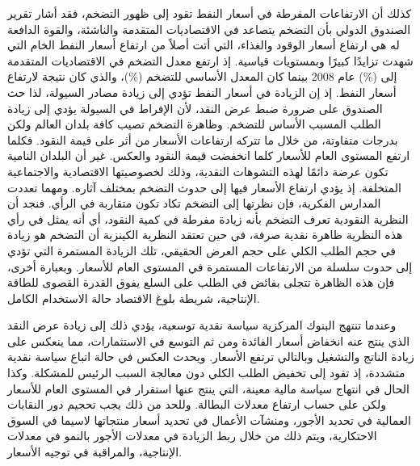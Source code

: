 \documentclass[10pt,a4paper]{report}
\begin{document}
\begin{doublespacing}
كذلك أن الارتفاعات المفرطة في أسعار النفط تقود إلى ظهور التضخم، فقد أشار تقرير الصندوق الدولي بأن التضخم يتصاعد في الاقتصاديات المتقدمة والناشئة، والقوة الدافعة له هي ارتفاع أسعار الوقود والغذاء، التي أتت أصلاً من ارتفاع أسعار النفط الخام التي شهدت تزايدًا كبيرًا وبمستويات قياسية. إذ ارتفع معدل التضخم في الاقتصاديات المتقدمة إلى (\%) عام 2008 بينما كان المعدل الأساسي للتضخم (\%)، والذي كان نتيجة لارتفاع أسعار النفط. إذ إن الزيادة في أسعار النفط تؤدي إلى زيادة مصادر السيولة، لذا حث الصندوق على ضرورة ضبط عرض النقد، لأن الإفراط في السيولة يؤدي إلى زيادة الطلب المسبب الأساس للتضخم. وظاهرة التضخم تصيب كافة بلدان العالم ولكن بدرجات متفاوتة، من خلال ما تتركه ارتفاعات الأسعار من أثر على قيمة النقود. فكلما ارتفع المستوى العام للأسعار كلما انخفضت قيمة النقود والعكس. غير أن البلدان النامية تكون عرضة دائمًا لهذه التشوهات النقدية، وذلك لخصوصيتها الاقتصادية والاجتماعية المتخلفة. إذ يؤدي ارتفاع الأسعار فيها إلى حدوث التضخم بمختلف آثاره. ومهما تعددت المدارس الفكرية، فإن نظرتها إلى التضخم تكاد تكون متقاربة في الرأي. فنجد أن النظرية النقودية تعرف التضخم بأنه زيادة مفرطة في كمية النقود، أي أنه يمثل في رأي هذه النظرية ظاهرة نقدية صرفة، في حين تعتقد النظرية الكينزية أن التضخم هو زيادة في حجم الطلب الكلي على حجم العرض الحقيقي، تلك الزيادة المستمرة التي تؤدي إلى حدوث سلسلة من الارتفاعات المستمرة في المستوى العام للأسعار. وبعبارة أخرى، فإن هذه الظاهرة تتجلى بفائض في الطلب على السلع يفوق القدرة القصوى للطاقة الإنتاجية، شريطة بلوغ الاقتصاد حالة الاستخدام الكامل.

وعندما تنتهج البنوك المركزية سياسة نقدية توسعية، يؤدي ذلك إلى زيادة عرض النقد الذي ينتج عنه انخفاض أسعار الفائدة ومن ثم التوسع في الاستثمارات، مما ينعكس على زيادة الناتج والتشغيل وبالتالي ترتفع الأسعار. ويحدث العكس في حالة اتباع سياسة نقدية متشددة، إذ تقود إلى تخفيض الطلب الكلي دون معالجة السبب الرئيس للمشكلة. وكذا الحال في انتهاج سياسة مالية معينة، التي ينتج عنها استقرار في المستوى العام للأسعار ولكن على حساب ارتفاع معدلات البطالة. وللحد من ذلك يجب تحجيم دور النقابات العمالية في تحديد الأجور، ومنشآت الأعمال في تحديد أسعار منتجاتها لاسيما في السوق الاحتكارية، ويتم ذلك من خلال ربط الزيادة في معدلات الأجور بالنمو في معدلات الإنتاجية، والمراقبة في توجيه الأسعار.


\end{doublespacing}
\end{document}
